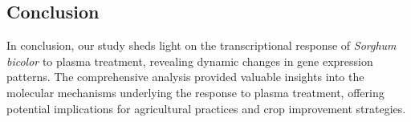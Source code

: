 \documentclass[12pt,letterpaper]{article}
\begin{document}
\subsection{Conclusion}

In conclusion, our study sheds light on the transcriptional response of \textit{Sorghum bicolor} to plasma treatment, revealing dynamic changes in gene expression patterns. The comprehensive analysis provided valuable insights into the molecular mechanisms underlying the response to plasma treatment, offering potential implications for agricultural practices and crop improvement strategies.

\clearpage
\nocite{*}
\printbibliography
\end{document}
